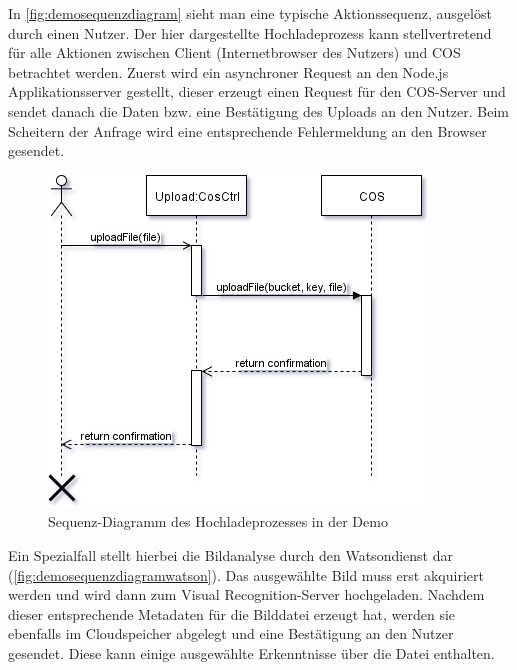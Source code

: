 In \autoref{fig:demosequenzdiagram} sieht man eine typische Aktionssequenz, ausgelöst durch einen Nutzer. Der hier dargestellte Hochladeprozess kann stellvertretend für alle Aktionen zwischen Client (Internetbrowser des Nutzers) und \ac{COS} betrachtet werden.
Zuerst wird ein asynchroner Request an den Node.js Applikationsserver gestellt, dieser erzeugt einen Request für den \ac{COS}-Server und sendet danach die Daten bzw. eine Bestätigung des Uploads an den Nutzer.
Beim Scheitern der Anfrage wird eine entsprechende Fehlermeldung an den Browser gesendet.

\begin{figure}[hbt]
	\centering
	\includegraphics[scale=0.85]{images/demo-sequenz-diagram}
	\caption{Sequenz-Diagramm des Hochladeprozesses in der Demo}
	\label{fig:demosequenzdiagram}
\end{figure}

Ein Spezialfall stellt hierbei die Bildanalyse durch den Watsondienst dar (\autoref{fig:demosequenzdiagramwatson}). Das ausgewählte Bild muss erst akquiriert werden und wird dann zum Visual Recognition-Server hochgeladen. Nachdem dieser entsprechende Metadaten für die Bilddatei erzeugt hat, werden sie ebenfalls im Cloudspeicher abgelegt und eine Bestätigung an den Nutzer gesendet.
Diese kann einige ausgewählte Erkenntnisse über die Datei enthalten.


